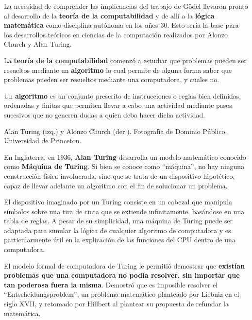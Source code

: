 La necesidad de comprender las implicancias del trabajo de Gödel llevaron
pronto al desarrollo de la \textbf{teoría de la computabilidad} y de allí
a la \textbf{lógica matemática} como disciplina autónoma en los años 30. Esto
sería la base para los desarrollos teóricos en ciencias de la computación
realizados por Alonzo Church y Alan Turing.

La \textbf{teoría de la computabilidad} comenzó a estudiar que problemas pueden
ser resueltos mediante un \textbf{algoritmo} lo cual permite de alguna forma
saber que problemas pueden ser resueltos mediante una computadora, y cuales no.

\begin{definition}
    Un \textbf{algoritmo} es un conjunto prescrito de instrucciones o reglas bien
    definidas, ordenadas y finitas que permiten llevar a cabo una actividad
    mediante pasos sucesivos que no generen dudas a quien deba hacer dicha
    actividad.
\end{definition}

{Alan Turing (izq.) y Alonzo Church (der.).}
{Fotografía de Dominio Público. Universidad de Princeton.}

En Inglaterra, en 1936, \textbf{Alan Turing} desarrolla un modelo matemático
conocido como \textbf{Máquina de Turing}. Si bien se conoce como ``máquina'',
no hay ninguna construcción física involucrada, sino que se trata de un
dispositivo hipotético, capaz de llevar adelante un algoritmo con el
fin de solucionar un problema.

El dispositivo imaginado por un Turing consiste en un cabezal que manipula
símbolos sobre una tira de cinta que se extiende infinitamente, basándose en una
tabla de reglas. A pesar de su simplicidad, una máquina de Turing puede ser
adaptada para simular la lógica de cualquier algoritmo de computadora y es
particularmente útil en la explicación de las funciones del CPU dentro de
una computadora.

El modelo formal de computadora de Turing le permitió demostrar que
\textbf{existían problemas que una computadora no podía resolver, sin importar
que tan poderosa fuera la misma}. Demostró que es imposible resolver el
``Entscheidungsproblem'', un problema matemático planteado por Liebniz
en el siglo XVII, y retomado por Hillbert al plantear su propuesta de refundar
la matemática.\autocite[cap. 12]{petzold_2008}

